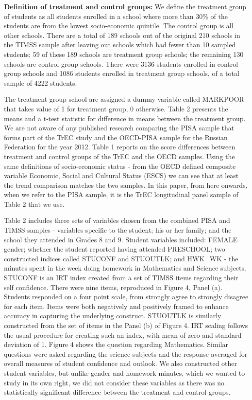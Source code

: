 \documentclass[alpha-refs,fleqn]{wiley-article_p2}
\begin{document}
\textbf{Definition of treatment and control groups:} We define the treatment group of students as all students enrolled in a school where more than 30\% of the students are from the lowest socio-economic quintile. The control group is all other schools. There are a total of 189 schools out of the original 210 schools in the TIMSS sample after leaving out schools which had fewer than 10 sampled students; 59 of these 189 schools are treatment group schools; the remaining 130 schools are control group schools. There were 3136 students enrolled in control group schools and 1086 students enrolled in treatment group schools, of a total sample of 4222 students. 

The treatment group school are assigned a dummy variable called MARKPOOR that takes value of 1 for treatment group, 0 otherwise. Table 2 presents the means and a t-test statistic for difference in means between the treatment group. We are not aware of any published research comparing the PISA sample that forms part of the TrEC study and the OECD-PISA sample for the Russian Federation for the year 2012. Table 1 reports on the score differences between treatment and control groups of the TrEC and the OECD samples. Using the same definitions of socio-economic status - from the OECD defined composite variable Economic, Social and Cultural Status (ESCS) we can see that at least the trend comparison matches the two samples. In this paper, from here onwards, when we refer to the PISA sample, it is the TrEC longitudinal panel sample of Table 2 that we use. 

Table 2 includes three sets of variables chosen from the combined PISA and TIMSS samples - variables specific to the student; his or her family; and the school they attended in Grades 8 and 9. Student variables included: FEMALE gender; whether the student reported having attended PRESCHOOL; two constructed indices called STUCONF and STUOUTLK; and HWK\_WK - the minutes spent in the week doing homework in Mathematics and Science subjects. STUCONF is an IRT index created from a set of TIMSS items regarding their self confidence. There were nine items, reproduced in Figure 4, Panel (a).  Students responded on a four point scale, from strongly agree to strongly disagree for each item. Items were both negatively and positively framed to enhance accuracy in capturing the underlying construct. STUOUTLK is similarly constructed from the set of items in the Panel (b) of Figure 4. IRT scaling follows the usual procedure for creating such an index, with mean of zero and standard deviation of 1. Figure 4 shows the question regarding Mathematics. Similar questions were asked regarding the science subjects and the response averaged for overall measures of student confidence and outlook. We also constructed other student variables, but unlike gender and homework minutes, which we wanted to study in its own right, we did not consider these variables as there was no statistically significant difference between the treatment and control groups. 
\end{document}
